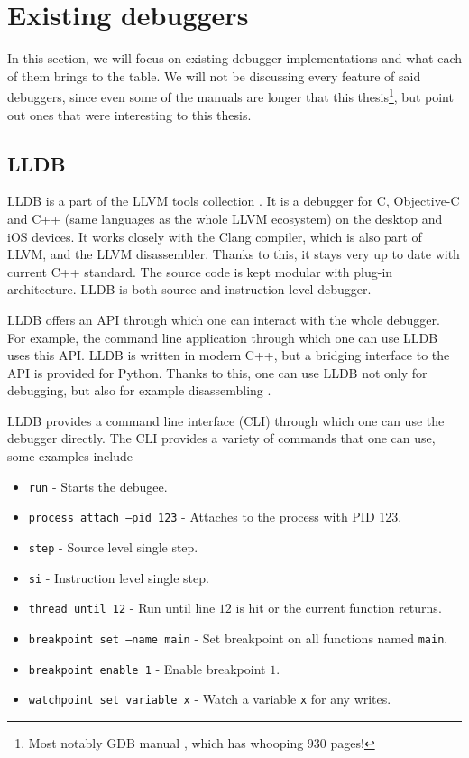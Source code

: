 \section{Existing debuggers}
In this section, we will focus on existing debugger implementations and what
each of them brings to the table. We will not be discussing every feature of
said debuggers, since even some of the manuals are longer that this
thesis\footnote{Most notably GDB manual \cite{gdb-manual}, which has whooping
930 pages!}, but point out ones that were interesting to this thesis.

\subsection{LLDB}
LLDB \cite{lldb} is a part of the LLVM tools collection \cite{llvm}. It is a
debugger for C, Objective-C and C++ (same languages as the whole LLVM
ecosystem) on the desktop and iOS devices. It works closely with the Clang
compiler, which is also part of LLVM, and the LLVM disassembler. Thanks to
this, it stays very up to date with current C++ standard. The source code is
kept modular with plug-in architecture. LLDB is both source and instruction
level debugger.

LLDB offers an API through which one can interact with the whole debugger. For
example, the command line application through which one can use LLDB uses this
API. LLDB is written in modern C++, but a bridging interface to the API is
provided for Python. Thanks to this, one can use LLDB not only for debugging,
but also for example disassembling \cite{lldb}.

LLDB provides a command line interface (CLI) through which one can use the debugger
directly. The CLI provides a variety of commands that one can use, some examples include
\begin{itemize}
    \item \texttt{run} - Starts the debugee.
    \item \texttt{process attach --pid 123} - Attaches to the process with PID
        123.
    \item \texttt{step} - Source level single step.
    \item \texttt{si} - Instruction level single step.
    \item \texttt{thread until 12} - Run until line $12$ is hit or the current
        function returns.
    \item \texttt{breakpoint set --name main} - Set breakpoint on all functions
        named \texttt{main}.
    \item \texttt{breakpoint enable 1} - Enable breakpoint $1$.
    \item \texttt{watchpoint set variable x} - Watch a variable \texttt{x} for
        any writes.
\end{itemize}

